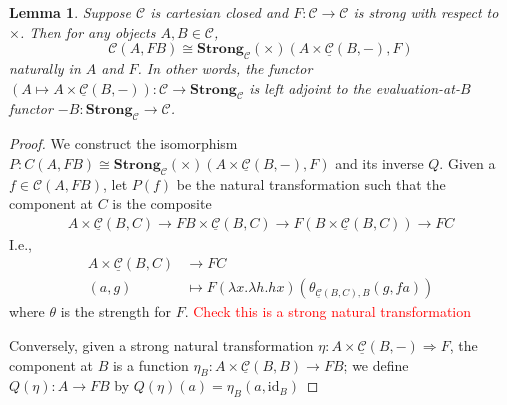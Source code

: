 \documentclass[11pt,a4paper]{article}
\theoremstyle{plain}
\newtheorem{lemma}[theorem]{Lemma}
\theoremstyle{definition}
\newcommand{\C}{\mathscr{C}}
\newcommand{\homC}{\underline{\C}}
\newcommand{\Strong}{\mathbf{Strong}}
\newcommand{\id}{\mathrm{id}}
\newcommand{\const}{\mathrm{const}}
\newcommand{\todo}[1]{\textcolor{red}{\small #1}}
\begin{document}
\begin{lemma}
  Suppose $\C$ is cartesian closed and $F : \C \to \C$ is strong with respect to $\times$. Then for any objects $A, B \in \C$, \[\C(A, FB) \cong \Strong_\C(\times)(A \times \homC(B, -), F)\]
naturally in $A$ and $F$. In other words, the functor $(A \mapsto A \times \homC(B, -)) : \C \to \Strong_\C$ is left adjoint to the evaluation-at-$B$ functor $-B : \Strong_\C \to \C$.
\end{lemma}
\begin{proof}
  We construct the isomorphism $P : C(A, FB) \cong \Strong_\C(\times)(A \times \homC(B, -), F)$ and its inverse $Q$.
  Given a $f \in \C(A, FB)$, let $P(f)$ be the natural transformation such that the component at $C$ is the composite
  \begin{align*}
    A \times \homC(B, C) \to FB \times \homC(B, C) \to F(B \times \homC(B, C)) \to FC
  \end{align*}
  I.e.,
  \begin{align*}
    A \times \homC(B, C) &\to FC \\
    (a, g) &\mapsto F(\lambda x. \lambda h. h x)(\theta_{\homC(B, C), B}(g, f a))
  \end{align*}
  where $\theta$ is the strength for $F$.
  \todo{Check this is a strong natural transformation}

  Conversely, given a strong natural transformation $\eta : A \times \homC(B, -) \Rightarrow F$, the component at $B$ is a function $\eta_B : A \times \homC(B, B) \to FB$; we define $Q(\eta) : A \to FB$ by $Q(\eta)(a) = \eta_B(a, \id_B)$



\end{proof}
\end{document}
